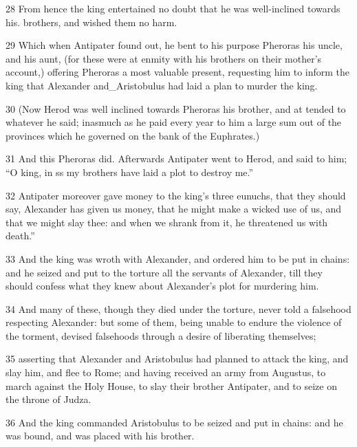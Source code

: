 \par 28 From hence the king entertained no doubt that he was well-inclined towards his. brothers, and wished them no harm. 

\par 29 Which when Antipater found out, he bent to his purpose Pheroras his uncle, and his aunt, (for these were at enmity with his brothers on their mother’s account,) offering Pheroras a most valuable present, requesting him to inform the king that Alexander and_Aristobulus had laid a plan to murder the king. 

\par 30 (Now Herod was well inclined towards Pheroras his brother, and at tended to whatever he said; inasmuch as he paid every year to him a large sum out of the provinces which he governed on the bank of the Euphrates.) 

\par 31 And this Pheroras did. Afterwards Antipater went to Herod, and said to him; “O king, in ss my brothers have laid a plot to destroy me.” 

\par 32 Antipater moreover gave money to the king's three eunuchs, that they should say, Alexander has given us money, that he might make a wicked use of us, and that we might slay thee: and when we shrank from it, he threatened us with death.” 

\par 33 And the king was wroth with Alexander, and ordered him to be put in chains: and he seized and put to the torture all the servants of Alexander, till they should confess what they knew about Alexander’s plot for murdering him. 

\par 34 And many of these, though they died under the torture, never told a falsehood respecting Alexander: but some of them, being unable to endure the violence of the torment, devised falsehoods through a desire of liberating themselves; 

\par 35 asserting that Alexander and Aristobulus had planned to attack the king, and slay him, and flee to Rome; and having received an army from Augustus, to march against the Holy House, to slay their brother Antipater, and to seize on the throne of Judza. 

\par 36 And the king commanded Aristobulus to be seized and put in chains: and he was bound, and was placed with his brother. 

